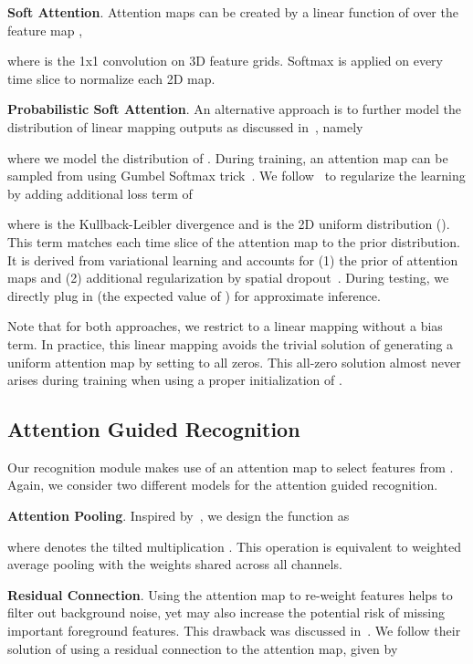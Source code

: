 \documentclass{bmvc2k}
\begin{document}
\noindent \textbf{Soft Attention}. Attention maps can be created by a linear function of  over the feature map ,

where  is the 1x1 convolution on 3D feature grids. Softmax is applied on every time slice to normalize each 2D map.

\noindent \textbf{Probabilistic Soft Attention}. An alternative approach is to further model the distribution of linear mapping outputs as discussed in~\cite{Li_2018_ECCV}, namely 

where we model the distribution of . During training, an attention map can be sampled from  using Gumbel Softmax trick~\cite{jang2016categorical,maddison2016concrete}. We follow~\cite{Li_2018_ECCV} to regularize the learning by adding additional loss term of 

where  is the Kullback-Leibler divergence and  is the 2D uniform distribution (). This term matches each time slice of the attention map to the prior distribution. It is derived from variational learning and accounts for (1) the prior of attention maps and (2) additional regularization by spatial dropout~\cite{Li_2018_ECCV}. During testing, we directly plug in  (the expected value of ) for approximate inference.

Note that for both approaches, we restrict  to a linear mapping without a bias term. In practice, this linear mapping avoids the trivial solution of generating a uniform attention map by setting  to all zeros. This all-zero solution almost never arises during training when using a proper initialization of .

\subsection{Attention Guided Recognition}
Our recognition module makes use of an attention map  to select features from . Again, we consider two different models for the attention guided recognition. 

\noindent \textbf{Attention Pooling}. Inspired by~\cite{wang2017residual,liu2019end}, we design the function  as 

where  denotes the tilted multiplication . This operation is equivalent to weighted average pooling with the weights shared across all channels.


\noindent \textbf{Residual Connection}. Using the attention map to re-weight features helps to filter out background noise, yet may also increase the potential risk of missing important foreground features. This drawback was discussed in~\cite{wang2017residual}. We follow their solution of using a residual connection to the attention map, given by 
\end{document}
